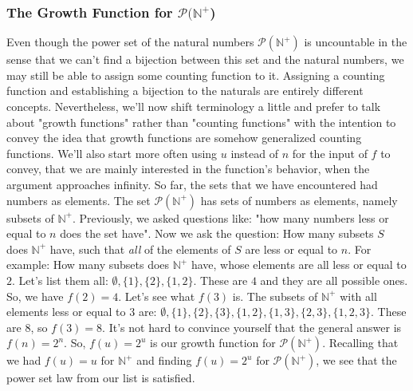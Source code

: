 \documentclass[12pt]{article}
\begin{document}
\subsubsection{The Growth Function for $\mathcal{P}(\mathbb{N}^+$)}
Even though the power set of the natural numbers $\mathcal{P}(\mathbb{N}^+)$ is uncountable in the sense that we can't find a bijection between this set and the natural numbers, we may still be able to assign some counting function to it. Assigning a counting function and establishing a bijection to the naturals are entirely different concepts. Nevertheless, we'll now shift terminology a little and prefer to talk about "growth functions" rather than "counting functions" with the intention to convey the idea that growth functions are somehow generalized counting functions. We'll also start more often using $u$ instead of $n$ for the input of $f$ to convey, that we are mainly interested in the function's behavior, when the argument approaches infinity. So far, the sets that we have encountered had numbers as elements. The set $\mathcal{P}(\mathbb{N}^+)$ has sets of numbers as elements, namely subsets of $\mathbb{N}^+$. Previously, we asked questions like: "how many numbers less or equal to $n$ does the set have". Now we ask the question: How many subsets $S$ does $\mathbb{N}^+$ have, such that \emph{all} of the elements of $S$ are less or equal to $n$. For example: How many subsets does $\mathbb{N}^+$ have, whose elements are all less or equal to $2$. Let's list them all: $\emptyset, \{1\}, \{2\}, \{1,2\}$. These are $4$ and they are all possible ones. So, we have $f(2) = 4$. Let's see what $f(3)$ is. The subsets of $\mathbb{N}^+$ with all elements less or equal to $3$ are: $\emptyset, \{1\}, \{2\}, \{3\}, \{1,2\}, \{1,3\}, \{2,3\}, \{1,2,3\}$. These are $8$, so $f(3) = 8$. It's not hard to convince yourself that the general answer is $f(n) = 2^n$. So, $f(u) = 2^u$ is our growth function for $\mathcal{P}(\mathbb{N}^+)$. Recalling that we had $f(u) = u$ for $\mathbb{N}^+$ and finding $f(u) = 2^u$ for $\mathcal{P}(\mathbb{N}^+)$, we see that the power set law from our list is satisfied.
\end{document}
